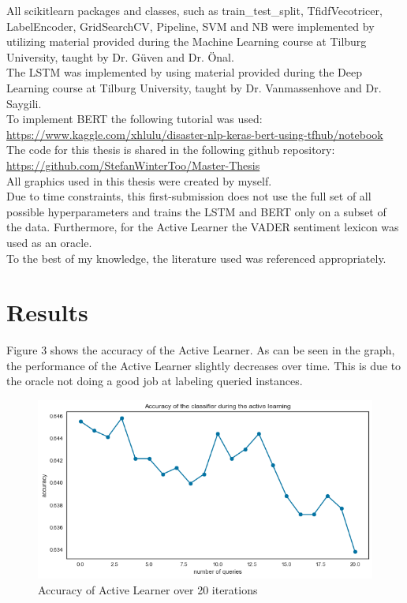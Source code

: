 \documentclass[11pt, a4paper]{article}
\begin{document}
\noindent All scikit\-learn packages and classes, such as train\_test\_split, TfidfVecotricer, LabelEncoder, GridSearchCV, 
Pipeline, SVM and NB were implemented by utilizing material provided during the Machine Learning course at Tilburg University, taught by Dr. Güven and Dr. Önal.\\

\noindent The LSTM was implemented by using material provided during the Deep Learning course at Tilburg University, taught by Dr. Vanmassenhove and Dr. Saygili.\\

\noindent To implement BERT the following tutorial was used: \url{https://www.kaggle.com/xhlulu/disaster-nlp-keras-bert-using-tfhub/notebook}\\


\noindent The code for this thesis is shared in the following github repository: \url{https://github.com/StefanWinterToo/Master-Thesis}\\

\noindent All graphics used in this thesis were created by myself.\\

\noindent Due to time constraints, this first-submission does not use the full set of all possible hyperparameters and trains the LSTM and BERT only on a subset of the data.
Furthermore, for the Active Learner the VADER sentiment lexicon was used as an oracle.\\

\noindent To the best of my knowledge, the literature used was referenced appropriately.



\section{Results}

Figure 3 shows the accuracy of the Active Learner. As can be seen in the graph, the performance of the Active Learner slightly decreases over time. This is due to the oracle not doing a good
job at labeling queried instances.

\begin{figure}
    \centering
    \includegraphics[width=\textwidth]{ActiveLearner.png}
    \caption{Accuracy of Active Learner over 20 iterations}
    \label{fig:ActiveLearner}
\end{figure}
\end{document}
